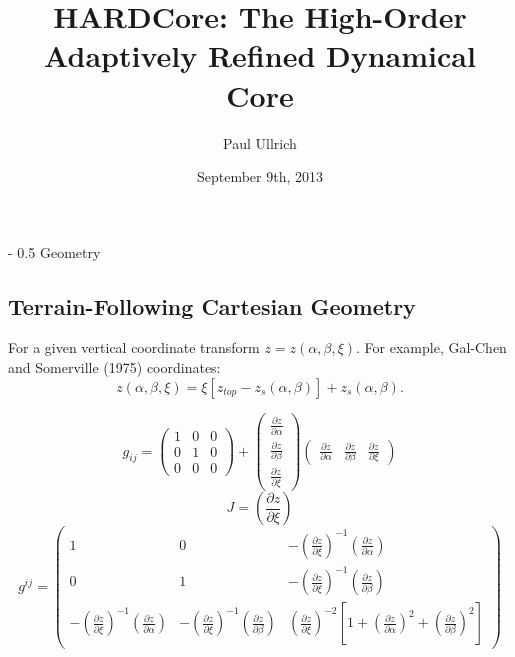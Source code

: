 \documentclass{article}
\title{\Huge \textbf{HARDCore: The High-Order Adaptively Refined Dynamical Core}}
\author{\Large Paul Ullrich}
\date{September 9th, 2013}
\makeatletter
\renewcommand\section{\@startsection
  {section}{2}{0mm}%
  {-\baselineskip}%
  {0.5\baselineskip}%
  {\normalfont\Huge\bfseries}}%
\newcommand{\pdiff}[2]{\frac{\partial #1}{\partial #2}}
\makeatother
\begin{document}
\section{Geometry}

\subsection{Terrain-Following Cartesian Geometry}

For a given vertical coordinate transform $z = z(\alpha, \beta, \xi)$.  For example, Gal-Chen and Somerville (1975) coordinates:
\begin{equation}
z(\alpha, \beta, \xi) = \xi \left[ z_{top} - z_s(\alpha, \beta) \right] + z_s(\alpha, \beta).
\end{equation}

\begin{equation}
g_{ij} = \left( \begin{array}{ccc} 1 & 0 & 0 \\[2.0ex] 0 & 1 & 0 \\[2.0ex] 0 & 0 & 0 \end{array} \right) + \left( \begin{array}{c} \pdiff{z}{\alpha} \\[2.0ex] \pdiff{z}{\beta} \\[2.0ex] \pdiff{z}{\xi} \end{array} \right) \left( \begin{array}{ccc} \pdiff{z}{\alpha} & \pdiff{z}{\beta} & \pdiff{z}{\xi} \end{array} \right)
\end{equation}
\begin{equation}
J = \left( \pdiff{z}{\xi} \right)
\end{equation}
\begin{equation}
g^{ij} = \left( \begin{array}{ccc} 1 & 0 & - \left( \pdiff{z}{\xi} \right)^{-1} \left( \pdiff{z}{\alpha} \right) \\[2.0ex] 0 & 1 & - \left( \pdiff{z}{\xi} \right)^{-1} \left( \pdiff{z}{\beta} \right) \\[2.0ex] - \left( \pdiff{z}{\xi} \right)^{-1} \left( \pdiff{z}{\alpha} \right) & - \left( \pdiff{z}{\xi} \right)^{-1} \left( \pdiff{z}{\beta} \right) & \left( \pdiff{z}{\xi} \right)^{-2} \left[ 1 + \left( \pdiff{z}{\alpha} \right)^2 + \left( \pdiff{z}{\beta} \right)^2 \right] \end{array} \right)
\end{equation}
\end{document}
